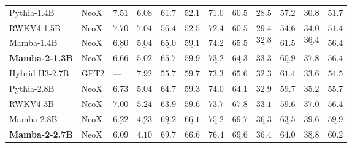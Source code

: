 \documentclass{article}
\begin{document}
\begin{table}[!ht]
{\begin{tabular}{@{}llllllllllll@{}}
      Pythia-1.4B                    & NeoX        & $7.51$             & $6.08$             & $61.7$             & $52.1$             & $71.0$             & $60.5$             & $28.5$               & $57.2$             & $30.8$               & $51.7$ \\
      RWKV4-1.5B                     & NeoX        & $7.70$             & $7.04$             & $56.4$             & $52.5$             & $72.4$             & $60.5$             & $29.4$               & $54.6$             & $34.0$               & $51.4$ \\
      Mamba-1.4B                     & NeoX        & $\underline{6.80}$ & $\underline{5.04}$ & $\underline{65.0}$ & $\underline{59.1}$ & $\mathbf{74.2}$    & $\mathbf{65.5}$    & $$\underline{32.8}$$ & $\mathbf{61.5}$    & $$\underline{36.4}$$ & $\mathbf{56.4}$ \\
      \textbf{Mamba-2-1.3B}          & NeoX        & $\mathbf{6.66}$    & $\mathbf{5.02}$    & $\mathbf{65.7}$    & $\mathbf{59.9}$    & $\underline{73.2}$ & $\underline{64.3}$ & $\mathbf{33.3}$      & $\underline{60.9}$ & $\mathbf{37.8}$      & $\mathbf{56.4}$ \\
      \midrule
      Hybrid H3-2.7B                 & GPT2        & ---                  & $7.92$             & $55.7$             & $59.7$             & $73.3$             & $65.6$             & $32.3$               & $61.4$             & $33.6$               & $54.5$ \\
      Pythia-2.8B                    & NeoX        & $6.73$             & $5.04$             & $64.7$             & $59.3$             & $74.0$             & $64.1$             & $32.9$               & $59.7$             & $35.2$               & $55.7$ \\
      RWKV4-3B                       & NeoX        & $7.00$             & $5.24$             & $63.9$             & $59.6$             & $73.7$             & $67.8$             & $33.1$               & $59.6$             & $37.0$               & $56.4$ \\
      Mamba-2.8B                     & NeoX        & $\underline{6.22}$ & $\underline{4.23}$ & $\underline{69.2}$ & $\underline{66.1}$ & $\underline{75.2}$ & $\mathbf{69.7}$    & $\underline{36.3}$   & $\underline{63.5}$ & $\mathbf{39.6}$      & $\underline{59.9}$ \\
      \textbf{Mamba-2-2.7B}          & NeoX        & $\mathbf{6.09}$    & $\mathbf{4.10}$    & $\mathbf{69.7}$    & $\mathbf{66.6}$    & $\mathbf{76.4}$    & $\underline{69.6}$ & $\mathbf{36.4}$      & $\mathbf{64.0}$    & $\underline{38.8}$   & $\mathbf{60.2}$ \\
      \bottomrule
    \end{tabular}
  }
  \label{table:downstream_zeroshot}
\end{table}
\end{document}
